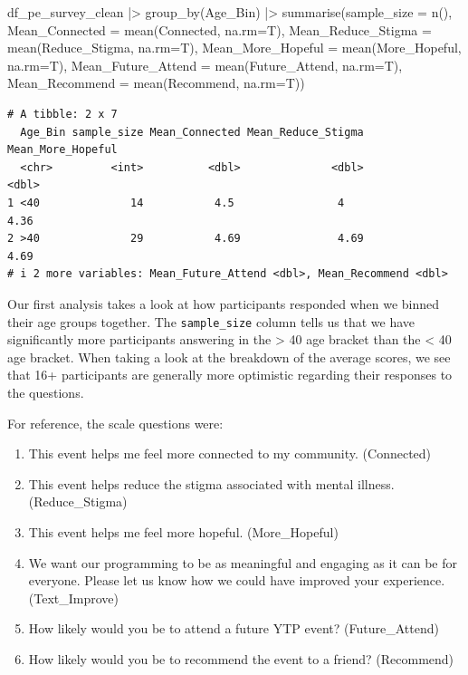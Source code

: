 \documentclass[
  letterpaper,
  DIV=11,
  numbers=noendperiod]{scrartcl}
\newenvironment{Shaded}{\begin{snugshade}}{\end{snugshade}}
\newcommand{\AttributeTok}[1]{\textcolor[rgb]{0.40,0.45,0.13}{#1}}
\newcommand{\FunctionTok}[1]{\textcolor[rgb]{0.28,0.35,0.67}{#1}}
\newcommand{\NormalTok}[1]{\textcolor[rgb]{0.00,0.23,0.31}{#1}}
\newcommand{\SpecialCharTok}[1]{\textcolor[rgb]{0.37,0.37,0.37}{#1}}
\begin{document}
\begin{Shaded}
\begin{Highlighting}[]
\NormalTok{df\_pe\_survey\_clean }\SpecialCharTok{|\textgreater{}} 
  \FunctionTok{group\_by}\NormalTok{(Age\_Bin) }\SpecialCharTok{|\textgreater{}} 
  \FunctionTok{summarise}\NormalTok{(}\AttributeTok{sample\_size =} \FunctionTok{n}\NormalTok{(),}
            \AttributeTok{Mean\_Connected =} \FunctionTok{mean}\NormalTok{(Connected, }\AttributeTok{na.rm=}\NormalTok{T),}
            \AttributeTok{Mean\_Reduce\_Stigma =} \FunctionTok{mean}\NormalTok{(Reduce\_Stigma, }\AttributeTok{na.rm=}\NormalTok{T),}
            \AttributeTok{Mean\_More\_Hopeful =} \FunctionTok{mean}\NormalTok{(More\_Hopeful, }\AttributeTok{na.rm=}\NormalTok{T),}
            \AttributeTok{Mean\_Future\_Attend =} \FunctionTok{mean}\NormalTok{(Future\_Attend, }\AttributeTok{na.rm=}\NormalTok{T),}
            \AttributeTok{Mean\_Recommend =} \FunctionTok{mean}\NormalTok{(Recommend, }\AttributeTok{na.rm=}\NormalTok{T))}
\end{Highlighting}
\end{Shaded}

\begin{verbatim}
# A tibble: 2 x 7
  Age_Bin sample_size Mean_Connected Mean_Reduce_Stigma Mean_More_Hopeful
  <chr>         <int>          <dbl>              <dbl>             <dbl>
1 <40              14           4.5                4                 4.36
2 >40              29           4.69               4.69              4.69
# i 2 more variables: Mean_Future_Attend <dbl>, Mean_Recommend <dbl>
\end{verbatim}

Our first analysis takes a look at how participants responded when we
binned their age groups together. The \texttt{sample\_size} column tells
us that we have significantly more participants answering in the
\textgreater{} 40 age bracket than the \textless{} 40 age bracket. When
taking a look at the breakdown of the average scores, we see that 16+
participants are generally more optimistic regarding their responses to
the questions.

For reference, the scale questions were:

\begin{enumerate}
\def\labelenumi{\arabic{enumi}.}
\item
  This event helps me feel more connected to my community. (Connected)
\item
  This event helps reduce the stigma associated with mental illness.
  (Reduce\_Stigma)
\item
  This event helps me feel more hopeful. (More\_Hopeful)
\item
  We want our programming to be as meaningful and engaging as it can be
  for everyone. Please let us know how we could have improved your
  experience. (Text\_Improve)
\item
  How likely would you be to attend a future YTP event? (Future\_Attend)
\item
  How likely would you be to recommend the event to a friend?
  (Recommend)
\end{enumerate}
\end{document}
